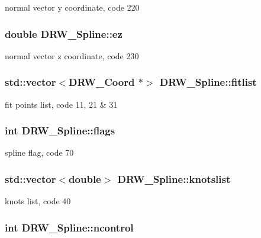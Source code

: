 normal vector y coordinate, code 220 \hypertarget{classDRW__Spline_ad3ad8a265fbc8c07bc06f8939a8a31a6}{
\subsubsection[{ez}]{\setlength{\rightskip}{0pt plus 5cm}double D\-R\-W\-\_\-\-Spline\-::ez}}\label{classDRW__Spline_ad3ad8a265fbc8c07bc06f8939a8a31a6}
normal vector z coordinate, code 230 \hypertarget{classDRW__Spline_aeefb7618b8c983a9abe32f974c8ca852}{
\subsubsection[{fitlist}]{\setlength{\rightskip}{0pt plus 5cm}std\-::vector$<${\bf D\-R\-W\-\_\-\-Coord} $\ast$$>$ D\-R\-W\-\_\-\-Spline\-::fitlist}}\label{classDRW__Spline_aeefb7618b8c983a9abe32f974c8ca852}
fit points list, code 11, 21 \& 31 \hypertarget{classDRW__Spline_a49110f44d95d47090449c56beaaac3ca}{
\subsubsection[{flags}]{\setlength{\rightskip}{0pt plus 5cm}int D\-R\-W\-\_\-\-Spline\-::flags}}\label{classDRW__Spline_a49110f44d95d47090449c56beaaac3ca}
spline flag, code 70 \hypertarget{classDRW__Spline_a90bf2f53cd19d98629e393f3cdd36c95}{
\subsubsection[{knotslist}]{\setlength{\rightskip}{0pt plus 5cm}std\-::vector$<$double$>$ D\-R\-W\-\_\-\-Spline\-::knotslist}}\label{classDRW__Spline_a90bf2f53cd19d98629e393f3cdd36c95}
knots list, code 40 \hypertarget{classDRW__Spline_a73dcf2fa67f1029e4a8d6577b5b51656}{
\subsubsection[{ncontrol}]{\setlength{\rightskip}{0pt plus 5cm}int D\-R\-W\-\_\-\-Spline\-::ncontrol}}\label{classDRW__Spline_a73dcf2fa67f1029e4a8d6577b5b51656}

